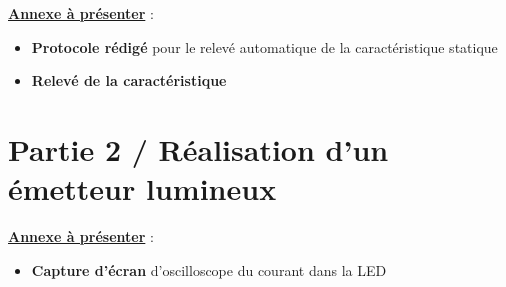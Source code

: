 \noindent
\underline{\textbf{Annexe à présenter}} :

\begin{itemize}[label=$\square$]
	\item \textbf{Protocole rédigé} pour le relevé automatique de la caractéristique statique
	\item \textbf{Relevé de la caractéristique}
\end{itemize}

\section{Partie 2 / Réalisation d'un émetteur lumineux}

\noindent
\begin{minipage}{0.48\linewidth}
\end{minipage}
\hfill
\begin{minipage}{0.48\linewidth}
\end{minipage}

\medskip

\noindent
{}

\medskip

\noindent
\underline{\textbf{Annexe à présenter}} :

\begin{itemize}[label=$\square$]
	\item \textbf{Capture d'écran} d'oscilloscope du courant dans la LED
\end{itemize}

\medskip

\noindent
\begin{minipage}{0.23\linewidth}
\end{minipage}
\hfill
\begin{minipage}{0.23\linewidth}
\end{minipage}
\hfill
\begin{minipage}{0.23\linewidth}
\hfill
\end{minipage}
\hfill
\begin{minipage}{0.23\linewidth}
\hfill
\end{minipage}

